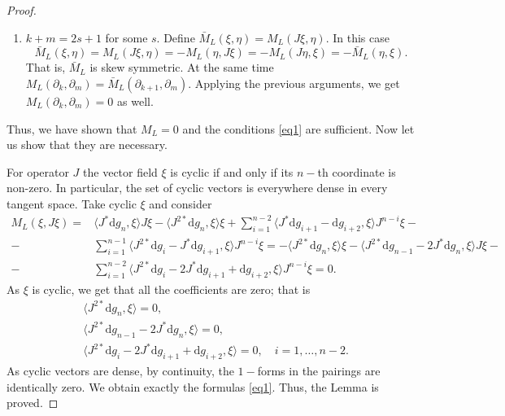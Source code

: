 \documentclass[10pt,a4paper]{amsart}
\newcommand{\ddd}{\mathrm{d}}
\begin{document}
\begin{proof}
\begin{enumerate}
    $$
    M_L(\partial_k, \partial_m) = M_L(J^k \partial_n, J^m \partial_n) = M_L(J^{k + 1} \partial_n, J^{m - 1} \partial_n) = \dots = M_L(J^s\partial_n, J^s \partial_n) = 0.
    $$
    The last equality holds due to the fact that $M_L$ is skew symmetric in lower indices.
    \item $k + m = 2s + 1$ for some $s$. Define $\bar M_L(\xi, \eta) = M_L(J\xi, \eta)$. In this case
    $$
    \bar M_L(\xi, \eta) = M_L(J\xi, \eta) = - M_L(\eta, J\xi) = - M_L(J\eta, \xi) = - \bar M_L (\eta, \xi).
    $$
    That is, $\bar M_L$ is skew symmetric. At the same time $M_L(\partial_k, \partial_m)= \bar M_L(\partial_{k+1}, \partial_m)$. Applying the previous arguments, we get $M_L(\partial_k, \partial_m) = 0$ as well.
\end{enumerate}
Thus, we have shown that $M_L = 0$ and the conditions \eqref{eq1} are sufficient. Now let us show that they are necessary. 

For operator $J$ the vector field $\xi$ is cyclic if and only if its $n-$th coordinate is non-zero. In particular, the set of cyclic vectors is everywhere dense in every tangent space. Take cyclic $\xi$ and consider
$$
\begin{aligned}
M_L(\xi, J\xi) = & \langle J^* \ddd g_n, \xi \rangle J\xi - \langle J^{2*} \ddd g_n, \xi \rangle \xi + \sum_{i = 1}^{n - 2} \langle J^* \ddd g_{i + 1} - \ddd g_{i + 2}, \xi \rangle J^{n - i} \xi - \\
- & \sum_{i = 1}^{n - 1} \langle J^{2*} \ddd g_i - J^*\ddd g_{i + 1}, \xi \rangle J^{n - i}\xi = - \langle J^{2*} \ddd g_n, \xi \rangle \xi - \langle J^{2*} \ddd g_{n - 1} - 2 J^* \ddd g_n , \xi \rangle J\xi - \\
- & \sum_{i = 1}^{n - 2} \langle J^{2*} \ddd g_i - 2 J^* \ddd g_{i + 1} + \ddd g_{i + 2}, \xi \rangle J^{n - i}\xi = 0.
\end{aligned}
$$
As $\xi$ is cyclic, we get that all the coefficients are zero; that is
$$
\begin{aligned}
& \langle J^{2*} \ddd g_n, \xi \rangle = 0, \\
& \langle J^{2*} \ddd g_{n - 1} - 2 J^* \ddd g_n , \xi \rangle = 0, \\
& \langle J^{2*} \ddd g_i - 2 J^* \ddd g_{i + 1} + \ddd g_{i + 2}, \xi \rangle = 0, \quad i = 1, \dots, n - 2.
\end{aligned}
$$
As cyclic vectors are dense, by continuity, the $1-$forms in the pairings are identically zero. We obtain exactly the formulas \eqref{eq1}. Thus, the Lemma is proved.
\end{proof}
\end{document}
